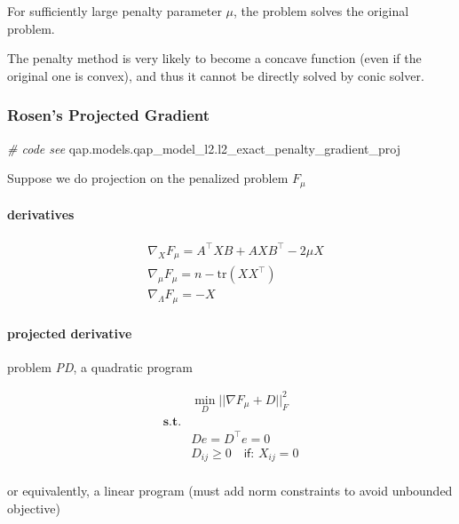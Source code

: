 \documentclass[
  10pt,
  a4paper,
,tablecaptionabove
]{scrartcl}
\newenvironment{Shaded}{}{}
\newcommand{\CommentTok}[1]{\textcolor[rgb]{0.38,0.63,0.69}{\textit{#1}}}
\newcommand{\NormalTok}[1]{#1}
\begin{document}
For sufficiently large penalty parameter \(\mu\), the problem solves the
original problem.

The penalty method is very likely to become a concave function (even if
the original one is convex), and thus it cannot be directly solved by
conic solver.

\hypertarget{rosens-projected-gradient}{%
\subsubsection{Rosen's Projected
Gradient}\label{rosens-projected-gradient}}

\begin{Shaded}
\begin{Highlighting}[]
\CommentTok{\# code see}
\NormalTok{qap.models.qap\_model\_l2.l2\_exact\_penalty\_gradient\_proj}
\end{Highlighting}
\end{Shaded}

Suppose we do projection on the penalized problem \(F_\mu\)

\hypertarget{derivatives}{%
\paragraph{derivatives}\label{derivatives}}

\[\begin{aligned}
& \nabla_X F_\mu  = A^\top XB + AXB^\top - 2\mu X \\
& \nabla_\mu F_\mu  = n - \textrm{tr}(XX^\top) \\
& \nabla_\Lambda F_\mu  = - X
\end{aligned}\]

\hypertarget{projected-derivative}{%
\paragraph{projected derivative}\label{projected-derivative}}

problem \emph{PD}, a quadratic program

\[\begin{aligned}
&\min_D ||\nabla F_\mu + D ||_F^2  \\
\mathbf{s.t.} & \\
&D e = D^\top e = 0 \\ 
&D_{ij} \ge 0 \quad \textsf{if: } X_{ij} = 0\\
\end{aligned}\]

or equivalently, a linear program (must add norm constraints to avoid
unbounded objective)
\end{document}
